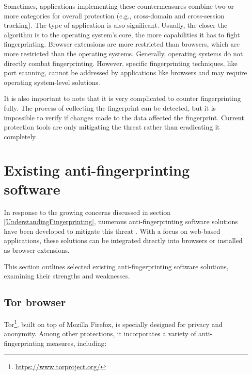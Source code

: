 Sometimes, applications implementing these countermeasures combine two or more categories for overall protection (e.g., cross-domain and cross-session tracking). The type of application is also significant. Usually, the closer the algorithm is to the operating system's core, the more capabilities it has to fight fingerprinting. Browser extensions are more restricted than browsers, which are more restricted than the operating systems. Generally, operating systems do not directly combat fingerprinting. However, specific fingerprinting techniques, like port scanning, cannot be addressed by applications like browsers and may require operating system-level solutions.

It is also important to note that it is very complicated to counter fingerprinting fully. The process of collecting the fingerprint can be detected, but it is impossible to verify if changes made to the data affected the fingerprint. Current protection tools are only mitigating the threat rather than eradicating it completely.

\section{Existing anti-fingerprinting software}
\label{Section:FingerprintingSoftware}

In response to the growing concerns discussed in section \ref{UnderstandingFingerprinting}, numerous anti-fingerprinting software solutions have been developed to mitigate this threat \cite{PrivacyTechEvaluation}. With a focus on web-based applications, these solutions can be integrated directly into browsers or installed as browser extensions.

This section outlines selected existing anti-fingerprinting software solutions, examining their strengths and weaknesses.

\subsection{Tor browser}

Tor\footnote{\url{https://www.torproject.org/}}, built on top of Mozilla Firefox, is specially designed for privacy and anonymity. Among other protections, it incorporates a variety of anti-fingerprinting measures, including:

